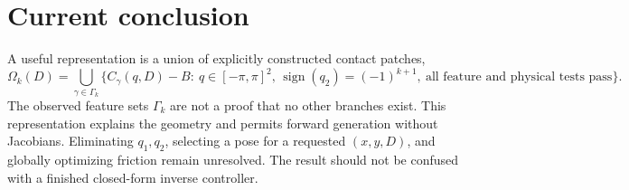 \documentclass{article}
\begin{document}
\section{Current conclusion}
A useful representation is a union of explicitly constructed contact patches,
\[
\Omega_k(D)=\bigcup_{\gamma\in\Gamma_k}
\{C_\gamma(q,D)-B:\ q\in[-\pi,\pi]^2,\,
\operatorname{sign}(q_2)=(-1)^{k+1},\ \text{all feature and physical tests pass}\}.
\]
The observed feature sets $\Gamma_k$ are not a proof that no other branches exist.
This representation explains the geometry and permits forward generation without Jacobians. Eliminating $q_1,q_2$, selecting a pose for a requested $(x,y,D)$, and globally optimizing friction remain unresolved. The result should not be confused with a finished closed-form inverse controller.
\end{document}
